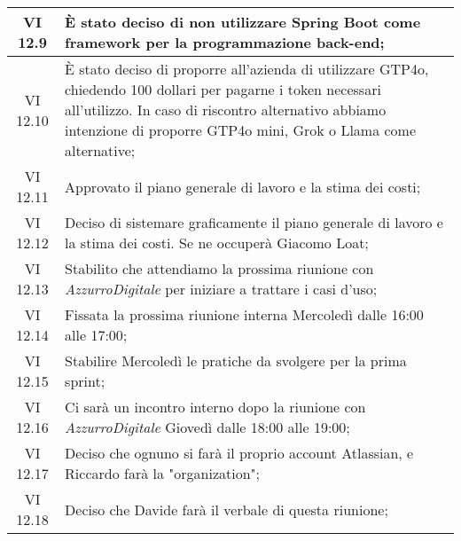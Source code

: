 \begin{table}[htbp]
\begin{tabular}{|c|p{}|}
        \hline
        VI 12.9 & È stato deciso di non utilizzare Spring Boot come framework per la programmazione back-end;\\
        \hline
        VI 12.10 & È stato deciso di proporre all'azienda di utilizzare GTP4o, chiedendo 100 dollari per pagarne i token necessari all'utilizzo. In caso di riscontro alternativo abbiamo intenzione di proporre GTP4o mini, Grok o Llama come alternative;\\
        \hline
        VI 12.11 & Approvato il piano generale di lavoro e la stima dei costi;\\
        \hline
        VI 12.12 & Deciso di sistemare graficamente il piano generale di lavoro e la stima dei costi. Se ne occuperà Giacomo Loat;\\
        \hline
        VI 12.13 & Stabilito che attendiamo la prossima riunione con \emph{AzzurroDigitale} per iniziare a trattare i casi d'uso;\\
        \hline
        VI 12.14 & Fissata la prossima riunione interna Mercoledì dalle 16:00 alle 17:00;\\
        \hline
        VI 12.15 & Stabilire Mercoledì le pratiche da svolgere per la prima sprint;\\
        \hline
        VI 12.16 & Ci sarà un incontro interno dopo la riunione con \emph{AzzurroDigitale} Giovedì dalle 18:00 alle 19:00;\\
        \hline
        VI 12.17 & Deciso che ognuno si farà il proprio account Atlassian, e Riccardo farà la "organization";\\
        \hline
        VI 12.18 & Deciso che Davide farà il verbale di questa riunione;\\
        \hline
    \end{tabular}
\end{table}